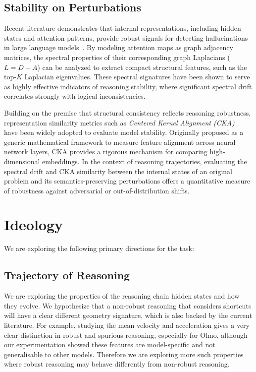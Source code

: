\documentclass{article}
\begin{document}
\subsection{Stability on Perturbations}

Recent literature demonstrates that internal representations, including hidden states and attention patterns, provide robust signals for detecting hallucinations in large language models~\citep{sriramanan2024llmcheck}. By modeling attention maps as graph adjacency matrices, the spectral properties of their corresponding graph Laplacians ($L = D - A$) can be analyzed to extract compact structural features, such as the top-$K$ Laplacian eigenvalues. These spectral signatures have been shown to serve as highly effective indicators of reasoning stability, where significant spectral drift correlates strongly with logical inconsistencies.

Building on the premise that structural consistency reflects reasoning robustness, representation similarity metrics such as \textit{Centered Kernel Alignment (CKA)}~\cite{kornblith2019similarity} have been widely adopted to evaluate model stability. Originally proposed as a generic mathematical framework to measure feature alignment across neural network layers, CKA provides a rigorous mechanism for comparing high-dimensional embeddings. In the context of reasoning trajectories, evaluating the spectral drift and CKA similarity between the internal states of an original problem and its semantics-preserving perturbations offers a quantitative measure of robustness against adversarial or out-of-distribution shifts.

\section{Ideology}
We are exploring the following primary directions for the task:

\subsection{Trajectory of Reasoning}
We are exploring the properties of the reasoning chain hidden states and how they evolve. We hypothesize that a non-robust reasoning that considers shortcuts will have a clear different geometry signature, which is also backed by the current literature. For example, studying the mean velocity and acceleration gives a very clear distinction in robust and spurious reasoning, especially for Olmo, although our experimentation showed these features are model-specific and not generalisable to other models. Therefore we are exploring more such properties where robust reasoning may behave differently from non-robust reasoning.  
\end{document}
